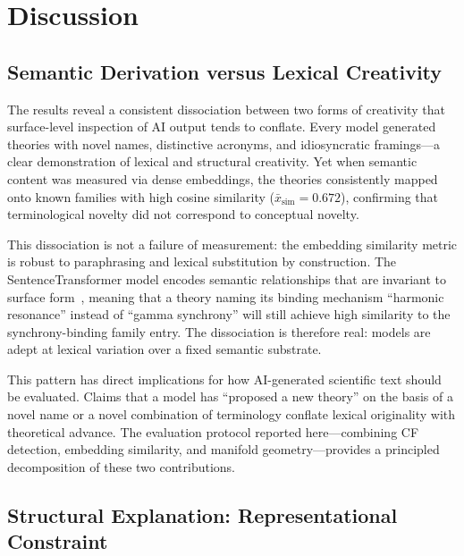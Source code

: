 \documentclass[pdflatex,sn-mathphys-num]{sn-jnl}
\begin{document}
\section{Discussion}
\label{sec:discussion}

\subsection{Semantic Derivation versus Lexical Creativity}

The results reveal a consistent dissociation between two forms of creativity
that surface-level inspection of AI output tends to conflate.  Every model
generated theories with novel names, distinctive acronyms, and idiosyncratic
framings---a clear demonstration of lexical and structural creativity.  Yet when
semantic content was measured via dense embeddings, the theories consistently
mapped onto known families with high cosine similarity ($\bar{x}_{\text{sim}} =
0.672$), confirming that terminological novelty did not correspond to conceptual
novelty.

This dissociation is not a failure of measurement: the embedding similarity
metric is robust to paraphrasing and lexical substitution by construction.  The
SentenceTransformer model encodes semantic relationships that are invariant to
surface form~\cite{reimers2019sentencebert}, meaning that a theory naming its
binding mechanism ``harmonic resonance'' instead of ``gamma synchrony'' will
still achieve high similarity to the synchrony-binding family entry.  The
dissociation is therefore real: models are adept at lexical variation over
a fixed semantic substrate.

This pattern has direct implications for how AI-generated scientific text should
be evaluated.  Claims that a model has ``proposed a new theory'' on the basis of
a novel name or a novel combination of terminology conflate lexical originality
with theoretical advance.  The evaluation protocol reported here---combining
CF detection, embedding similarity, and manifold geometry---provides a
principled decomposition of these two contributions.

\subsection{Structural Explanation: Representational Constraint}
\end{document}
